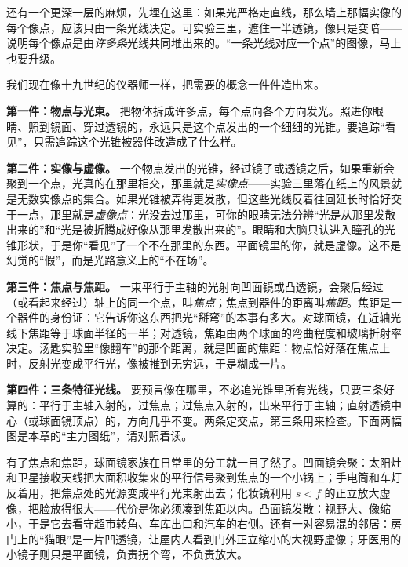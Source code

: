 \begin{mainline}
还有一个更深一层的麻烦，先埋在这里：如果光严格走直线，那么墙上那幅实像的每个像点，应该只由一条光线决定。可实验三里，遮住一半透镜，像只是变暗——说明每个像点是由\emph{许多条}光线共同堆出来的。“一条光线对应一个点”的图像，马上也要升级。


我们现在像十九世纪的仪器师一样，把需要的概念一件件造出来。

\textbf{第一件：物点与光束。} 把物体拆成许多点，每个点向各个方向发光。照进你眼睛、照到镜面、穿过透镜的，永远只是这个点发出的一个细细的光锥。要追踪“看见”，只需追踪这个光锥被器件改造成了什么样。

\textbf{第二件：实像与虚像。} 一个物点发出的光锥，经过镜子或透镜之后，如果重新会聚到一个点，光真的在那里相交，那里就是\emph{实像点}——实验三里落在纸上的风景就是无数实像点的集合。如果光锥被弄得更发散，但这些光线反着往回延长时恰好交于一点，那里就是\emph{虚像点}：光没去过那里，可你的眼睛无法分辨“光是从那里发散出来的”和“光是被折腾成好像从那里发散出来的”。眼睛和大脑只认进入瞳孔的光锥形状，于是你“看见”了一个不在那里的东西。平面镜里的你，就是虚像。这不是幻觉的“假”，而是光路意义上的“不在场”。

\textbf{第三件：焦点与焦距。} 一束平行于主轴的光射向凹面镜或凸透镜，会聚后经过（或看起来经过）轴上的同一个点，叫\emph{焦点}；焦点到器件的距离叫\emph{焦距}。焦距是一个器件的身份证：它告诉你这东西把光“掰弯”的本事有多大。对球面镜，在近轴光线下焦距等于球面半径的一半；对透镜，焦距由两个球面的弯曲程度和玻璃折射率决定。汤匙实验里“像翻车”的那个距离，就是凹面的焦距：物点恰好落在焦点上时，反射光变成平行光，像被推到无穷远，于是糊成一片。

\textbf{第四件：三条特征光线。} 要预言像在哪里，不必追光锥里所有光线，只要三条好算的：平行于主轴入射的，过焦点；过焦点入射的，出来平行于主轴；直射透镜中心（或球面镜顶点）的，方向几乎不变。两条定交点，第三条用来检查。下面两幅图是本章的“主力图纸”，请对照着读。

有了焦点和焦距，球面镜家族在日常里的分工就一目了然了。凹面镜会聚：太阳灶和卫星接收天线把大面积收集来的平行信号聚到焦点的一个小锅上；手电筒和车灯反着用，把焦点处的光源变成平行光束射出去；化妆镜利用 $s<f$ 的正立放大虚像，把脸放得很大——代价是你必须凑到焦距以内。凸面镜发散：视野大、像缩小，于是它去看守超市转角、车库出口和汽车的右侧。还有一对容易混的邻居：房门上的“猫眼”是一片凹透镜，让屋内人看到门外正立缩小的大视野虚像；牙医用的小镜子则只是平面镜，负责拐个弯，不负责放大。


\end{mainline}
